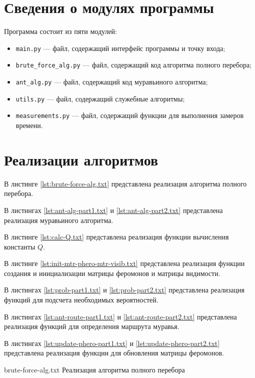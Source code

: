 \section{Сведения о модулях программы}

Программа состоит из пяти модулей: 

\begin{itemize}[label*=--]
	\item \texttt{main.py} --- файл, содержащий интерфейс программы и точку входа;
	\item \texttt{brute\_force\_alg.py} --- файл, содержащий код алгоритма полного перебора;
	\item \texttt{ant\_alg.py} --- файл, содержащий код муравьиного алгоритма;
	\item \texttt{utils.py} --- файл, содержащий служебные алгоритмы;
	\item \texttt{measurements.py} --- файл, содержащий функции для выполнения замеров времени.
\end{itemize}

\section{Реализации алгоритмов}

В листинге \ref{lst:brute-force-alg.txt} представлена реализация алгоритма полного перебора.

В листингах \ref{lst:ant-alg-part1.txt} и \ref{lst:ant-alg-part2.txt} представлена реализация муравьиного алгоритма.

В листинге \ref{lst:calc-Q.txt} представлена реализация функции вычисления константы $Q$.

В листинге \ref{lst:init-mtr-phero-mtr-visib.txt} представлена реализация функции создания и инициализации матрицы феромонов и матрицы видимости.

В листингах \ref{lst:prob-part1.txt} и \ref{lst:prob-part2.txt} представлена реализация функций для подсчета необходимых вероятностей.

В листингах \ref{lst:ant-route-part1.txt} и \ref{lst:ant-route-part2.txt} представлена реализация функций для определения маршрута муравья.

В листингах \ref{lst:update-phero-part1.txt} и \ref{lst:update-phero-part2.txt} представлена реализация функции для обновления матрицы феромонов.

\clearpage

{brute-force-alg.txt} %
{Реализация алгоритма полного перебора} %


